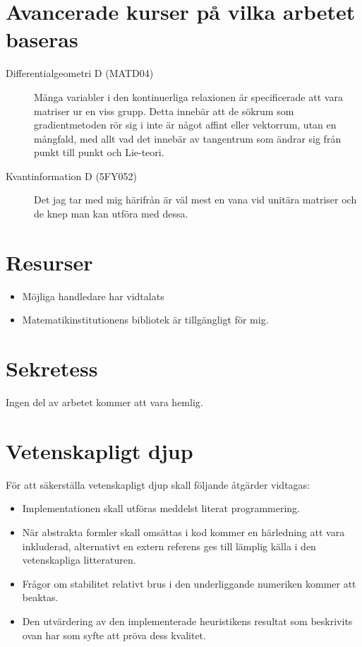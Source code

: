 \documentclass{article}
\begin{document}
\section{Avancerade kurser p\r{a} vilka arbetet baseras}

\begin{description}
  \item[Differentialgeometri D (MATD04)]
    M\r{a}nga variabler i den kontinuerliga relaxionen \"ar 
    specificerade att vara matriser ur en viss grupp. Detta inneb\"ar 
    att de s\"okrum som gradientmetoden r\"or sig i inte \"ar 
    n\r{a}got affint eller vektorrum, utan en m\r{a}ngfald, med allt 
    vad det inneb\"ar av tangentrum som \"andrar sig fr\r{a}n punkt 
    till punkt och Lie-teori.
  \item[Kvantinformation D (5FY052)]
    Det jag tar med mig h\"arifr\r{a}n \"ar v\"al mest en vana vid 
    unit\"ara matriser och de knep man kan utf\"ora med dessa.
\end{description}


\section{Resurser}

\begin{itemize}
  \item
    M\"ojliga handledare har vidtalats \fbox{\strut\kern5cm}
  \item
    Matematikinstitutionens bibliotek \"ar tillg\"angligt f\"or mig.
\end{itemize}


\section{Sekretess}

Ingen del av arbetet kommer att vara hemlig.


\section{Vetenskapligt djup}

F\"or att s\"akerst\"alla vetenskapligt djup skall f\"oljande 
\r{a}tg\"arder vidtagas:
\begin{itemize}
  \item
    Implementationen skall utf\"oras meddelst literat programmering. 
  \item
    N\"ar abstrakta formler skall oms\"attas i kod kommer en 
    h\"arledning att vara inkluderad, alternativt en extern referens 
    ges till l\"amplig k\"alla i den vetenskapliga litteraturen. 
  \item
    Fr\r{a}gor om stabilitet relativt brus i den underliggande 
    numeriken kommer att beaktas.
  \item
    Den utv\"ardering av den implementerade heuristikens resultat som 
    beskrivits ovan har som syfte att pr\"ova dess kvalitet.
\end{itemize}
\end{document}
